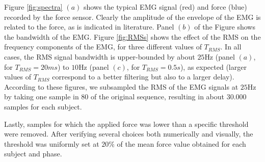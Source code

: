 \documentclass[10pt]{bmc_article}
\def\texttt{[image: ]}
\newenvironment{bmcformat}
  {\begin{raggedright}\baselineskip20pt\sloppy\setboolean{publ}{false}}
  {\end{raggedright}\baselineskip20pt\sloppy}
\begin{document}
\begin{bmcformat}


Figure \ref{fig:spectra} $(a)$ shows the typical EMG signal (red)
and force (blue) recorded by the force sensor. Clearly the
amplitude of the envelope of the EMG is related to the force, as is
indicated in literature. Panel $(b)$ of the Figure shows the bandwidth
of the EMG. Figure \ref{fig:RMSs} shows the effect of the RMS
on the frequency components of the EMG, for three different values of
$T_{RMS}$. In all cases, the RMS signal bandwidth is
upper-bounded by about $25$Hz (panel $(a)$, for $T_{RMS}=20ms$) to
$10$Hz (panel $(c)$, for $T_{RMS}=0.5s$), as expected (larger values
of $T_{RMS}$ correspond to a better filtering but also to a larger
delay). According to these figures, we subsampled the RMS of the EMG
signals at $25$Hz by taking one sample in $80$ of the original sequence,
resulting in about $30.000$ samples for each subject.

Lastly, samples for which the applied force was lower than a specific
threshold were removed. After verifying several choices both numerically
and visually, the threshold was uniformly set at $20\%$ of the mean force
value obtained for each subject and phase.


\end{bmcformat}
\end{document}
